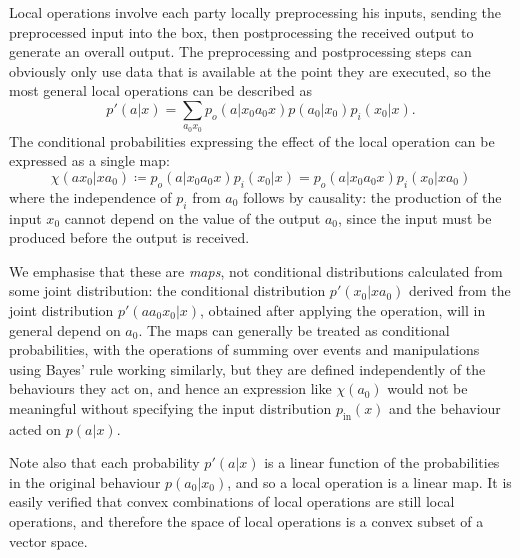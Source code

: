 \documentclass[10pt, a4paper]{article}
\numberwithin{equation}{section} %
\theoremstyle{definition}
\theoremstyle{plain}
\newcommand{\?}{\mathrel{?}} %
\newcommand{\prin}[1][p]{#1_{\mathrm{in}}}
\begin{document}
              Local operations involve each party locally preprocessing his inputs, sending the preprocessed input into the box, then postprocessing the received output to generate an overall output. The preprocessing and postprocessing steps can obviously only use data that is available at the point they are executed, so the most general local operations can be described as~\cite[Def. 4]{LocalTransformations}
              \begin{equation}
                p'(a|x) = \sum_{a_0 x_0} p_o(a|x_0 a_0 x) p(a_0|x_0) p_i(x_0|x).
              \end{equation}
              The conditional probabilities expressing the effect of the local operation can be expressed as a single map:
              \begin{equation}\label{eqn:opmap}
                \chi(a x_0 | x a_0) \coloneqq p_o(a|x_0a_0x) p_i(x_0|x) = p_o(a|x_0a_0x) p_i(x_0|x a_0)
              \end{equation}
              where the independence of \(p_i\) from \(a_0\) follows by causality: the production of the input \(x_0\) cannot depend on the value of the output \(a_0\), since the input must be produced before the output is received.

              We emphasise that these are \emph{maps}, not conditional distributions calculated from some joint distribution: the conditional distribution \(p'(x_0|x a_0)\) derived from the joint distribution \(p'(a a_0 x_0|x)\), obtained after applying the operation, will in general depend on \(a_0\). The maps can generally be treated as conditional probabilities, with the operations of summing over events and manipulations using Bayes' rule working similarly, but they are defined independently of the behaviours they act on, and hence an expression like \(\chi(a_0)\) would not be meaningful without specifying the input distribution \(\prin(x)\) and the behaviour acted on \(p(a|x)\).

              Note also that each probability \(p'(a|x)\) is a linear function of the probabilities in the original behaviour \(p(a_0|x_0)\), and so a local operation is a linear map. It is easily verified that convex combinations of local operations are still local operations, and therefore the space of local operations is a convex subset of a vector space.
\end{document}
